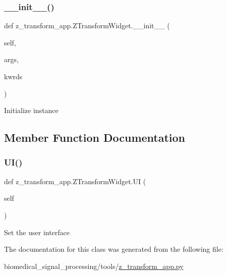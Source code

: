 \subsubsection{\texorpdfstring{\+\_\+\+\_\+init\+\_\+\+\_\+()}{\_\_init\_\_()}}
{\footnotesize\ttfamily def z\+\_\+transform\+\_\+app.\+Z\+Transform\+Widget.\+\_\+\+\_\+init\+\_\+\+\_\+ (\begin{DoxyParamCaption}\item[{}]{self,  }\item[{}]{args,  }\item[{}]{kwrds }\end{DoxyParamCaption})}

\begin{DoxyVerb}Initialize instance
\end{DoxyVerb}
 

\subsection{Member Function Documentation}
\mbox{\label{classz__transform__app_1_1ZTransformWidget_ad806831916f7d8246a281dbcc3ea58f7}} 
\subsubsection{\texorpdfstring{U\+I()}{UI()}}
{\footnotesize\ttfamily def z\+\_\+transform\+\_\+app.\+Z\+Transform\+Widget.\+UI (\begin{DoxyParamCaption}\item[{}]{self }\end{DoxyParamCaption})}

\begin{DoxyVerb}Set the user interface
\end{DoxyVerb}
 

The documentation for this class was generated from the following file\+:\begin{DoxyCompactItemize}
\item 
biomedical\+\_\+signal\+\_\+processing/tools/\hyperlink{z__transform__app_8py}{z\+\_\+transform\+\_\+app.\+py}\end{DoxyCompactItemize}
